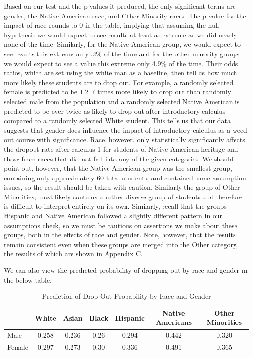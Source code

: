 \documentclass[]{article}
\begin{document}
Based on our test and the p values it produced, the only significant
terms are gender, the Native American race, and Other Minority races.
The p value for the impact of race rounds to 0 in the table, implying
that assuming the null hypothesis we would expect to see results at
least as extreme as we did nearly none of the time. Similarly, for the
Native American group, we would expect to see results this extreme only
.2\% of the time and for the other minority groups we would expect to
see a value this extreme only 4.9\% of the time. Their odds ratios,
which are set using the white man as a baseline, then tell us how much
more likely these students are to drop out. For example, a randomly
selected female is predicted to be 1.217 times more likely to drop out
than randomly selected male from the population and a randomly selected
Native American is predicted to be over twice as likely to drop out
after introductory calculus compared to a randomly selected White
student. This tells us that our data suggests that gender does influence
the impact of introductory calculus as a weed out course with
significance. Race, however, only statistically significantly affects
the dropout rate after calculus 1 for students of Native American
heritage and those from races that did not fall into any of the given
categories. We should point out, however, that the Native American group
was the smallest group, containing only approximately 60 total students,
and contained some assumption issues, so the result should be taken with
caution. Similarly the group of Other Minorities, most likely contains a
rather diverse group of students and therefore is difficult to interpret
entirely on its own. Similarly, recall that the groups Hispanic and
Native American followed a slightly different pattern in our assumptions
check, so we must be cautious on assertions we make about these groups,
both in the effects of race and gender. Note, however, that the results
remain consistent even when these groups are merged into the Other
category, the results of which are shown in Appendix C.

We can also view the predicted probability of dropping out by race and
gender in the below table.

\begin{table}[H]

\caption{\label{tab:pred}Prediction of Drop Out Probability by Race and Gender}
\centering
\fontsize{12}{14}\selectfont
\begin{tabular}[t]{l|c|c|c|c|c|c}
\hline
  & White & Asian & Black & Hispanic & Native Americans & Other Minorities\\
\hline
Male & 0.258 & 0.236 & 0.26 & 0.294 & 0.442 & 0.320\\
\hline
Female & 0.297 & 0.273 & 0.30 & 0.336 & 0.491 & 0.365\\
\hline
\end{tabular}
\end{table}
\end{document}
